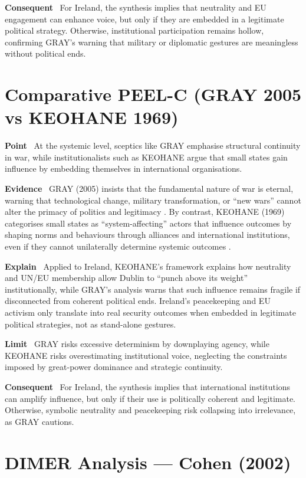 \textbf{Consequent} \
For Ireland, the synthesis implies that neutrality and EU engagement can enhance voice, but only if they are embedded in a legitimate political strategy. Otherwise, institutional participation remains hollow, confirming GRAY’s warning that military or diplomatic gestures are meaningless without political ends.

\section*{Comparative PEEL-C (GRAY 2005 vs KEOHANE 1969)}

\textbf{Point} \
At the systemic level, sceptics like GRAY emphasise structural continuity in war, while institutionalists such as KEOHANE argue that small states gain influence by embedding themselves in international organisations.

\textbf{Evidence} \
GRAY (2005) insists that the fundamental nature of war is eternal, warning that technological change, military transformation, or “new wars” cannot alter the primacy of politics and legitimacy \parencite{GRAY_2005}. By contrast, KEOHANE (1969) categorises small states as “system-affecting” actors that influence outcomes by shaping norms and behaviours through alliances and international institutions, even if they cannot unilaterally determine systemic outcomes \parencite{KEOHANE_1969}.

\textbf{Explain} \
Applied to Ireland, KEOHANE’s framework explains how neutrality and UN/EU membership allow Dublin to “punch above its weight” institutionally, while GRAY’s analysis warns that such influence remains fragile if disconnected from coherent political ends. Ireland’s peacekeeping and EU activism only translate into real security outcomes when embedded in legitimate political strategies, not as stand-alone gestures.

\textbf{Limit} \
GRAY risks excessive determinism by downplaying agency, while KEOHANE risks overestimating institutional voice, neglecting the constraints imposed by great-power dominance and strategic continuity.

\textbf{Consequent} \
For Ireland, the synthesis implies that international institutions can amplify influence, but only if their use is politically coherent and legitimate. Otherwise, symbolic neutrality and peacekeeping risk collapsing into irrelevance, as GRAY cautions.

\section*{DIMER Analysis — Cohen (2002)}

